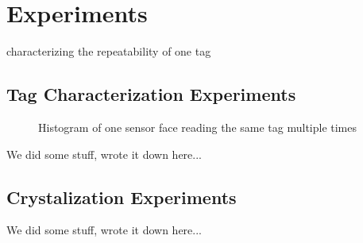\section{Experiments}
\label{sec:Experiments}
characterizing the repeatability of one tag


\subsection{Tag Characterization Experiments}

\begin{figure}[H]
	
	\caption{Histogram of one sensor face reading the same tag multiple times}
	\label{fig:histogram}
\end{figure}

We did some stuff, wrote it down here...

\subsection{Crystalization Experiments}

We did some stuff, wrote it down here...


